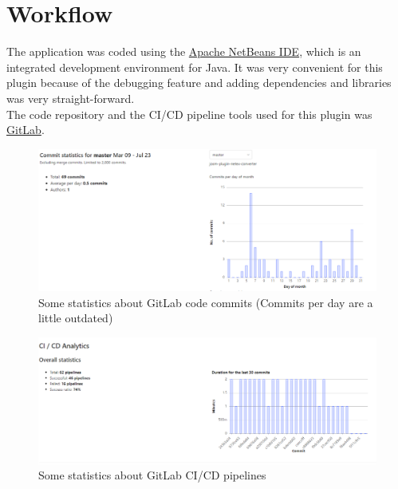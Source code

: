 \section{Workflow}
The application was coded using the \href{https://netbeans.org/}{Apache NetBeans IDE}, which is an integrated development environment for Java. It was very convenient for this plugin because of the debugging feature and adding dependencies and libraries was very straight-forward.\\
\newline
The code repository and the CI/CD pipeline tools used for this plugin was \href{https://gitlab.com/}{GitLab}.
\begin{figure}[H]
	\includegraphics[width=\linewidth]{./Images/Appendices/gitlab_commit_stats.png}
	\caption{Some statistics about GitLab code commits (Commits per day are a little outdated)}
\end{figure}
\begin{figure}[H]
	\includegraphics[width=\linewidth]{./Images/Appendices/gitlab_cicd_stats.png}
	\caption{Some statistics about GitLab CI/CD pipelines}
\end{figure}